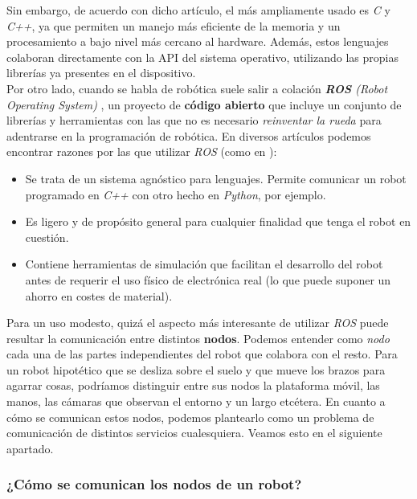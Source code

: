 Sin embargo, de acuerdo con dicho artículo, el más ampliamente usado es \textit{C} y \textit{C++}, ya que permiten un manejo más eficiente de la memoria y un procesamiento a bajo nivel más cercano al hardware. Además, estos lenguajes colaboran directamente con la API del sistema operativo, utilizando las propias librerías ya presentes en el dispositivo.\\

Por otro lado, cuando se habla de robótica suele salir a colación \textit{\textbf{ROS} (Robot Operating System)} \cite{why-ros}, un proyecto de \textbf{código abierto} que incluye un conjunto de librerías y herramientas con las que no es necesario \textit{reinventar la rueda} para adentrarse en la programación de robótica. En diversos artículos podemos encontrar razones por las que utilizar \textit{ROS} (como en \cite{reasons-ros}):

\begin{itemize}
	\item Se trata de un sistema agnóstico para lenguajes. Permite comunicar un robot programado en \textit{C++} con otro hecho en \textit{Python}, por ejemplo.
	\item Es ligero y de propósito general para cualquier finalidad que tenga el robot en cuestión.
	\item Contiene herramientas de simulación que facilitan el desarrollo del robot antes de requerir el uso físico de electrónica real (lo que puede suponer un ahorro en costes de material).
\end{itemize}

Para un uso modesto, quizá el aspecto más interesante de utilizar \textit{ROS} puede resultar la comunicación entre distintos \textbf{nodos}. Podemos entender como \textit{nodo} cada una de las partes independientes del robot que colabora con el resto. Para un robot hipotético que se desliza sobre el suelo y que mueve los brazos para agarrar cosas, podríamos distinguir entre sus nodos la plataforma móvil, las manos, las cámaras que observan el entorno y un largo etcétera. En cuanto a cómo se comunican estos nodos, podemos plantearlo como un problema de comunicación de distintos servicios cualesquiera. Veamos esto en el siguiente apartado.\\


\subsubsection{¿Cómo se comunican los nodos de un robot?}

